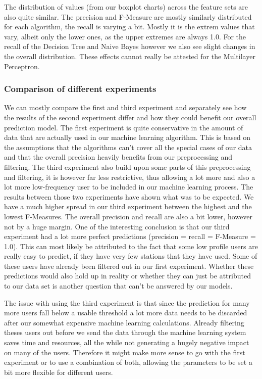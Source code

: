 The distribution of values (from our boxplot charts) across the feature sets are also quite similar. The precision and F-Measure are mostly similarly distributed for each algorithm, the recall is varying a bit. Mostly it is the extrem values that vary, albeit only the lower ones, as the upper extremes are always 1.0. For the recall of the Decision Tree and Naive Bayes however we also see slight changes in the overall distribution. These effects cannot really be attested for the Multilayer Perceptron.

\subsubsection{Comparison of different experiments}
We can mostly compare the first and third experiment and separately see how the results of the second experiment differ and how they could benefit our overall prediction model.
The first experiment is quite conservative in the amount of data that are actually used in our machine learning algorithm. This is based on the assumptions that the algorithms can't cover all the special cases of our data and that the overall precision heavily benefits from our preprocessing and filtering. The third experiment also build upon some parts of this preprocessing and filtering, it is however far less restrictive, thus allowing a lot more and also a lot more low-frequency user to be included in our machine learning process. The results between those two experiments have shown what was to be expected. We have a much higher spread in our third experiment between the highest and the lowest F-Measures. The overall precision and recall are also a bit lower, however not by a huge margin. One of the interesting conclusion is that our third experiment had a lot more perfect predictions (precision = recall = F-Measure = 1.0). This can most likely be attributed to the fact that some low profile users are really easy to predict, if they have very few stations that they have used. Some of these users have already been filtered out in our first experiment. Whether these predictions would also hold up in reality or whether they can just be attributed to our data set is another question that can't be answered by our models. 

The issue with using the third experiment is that since the prediction for many more users fall below a usable threshold a lot more data needs to be discarded after our somewhat expensive machine learning calculations. Already filtering theses users out before we send the data through the machine learning system saves time and resources, all the while not generating a hugely negative impact on many of the users. Therefore it might make more sense to go with the first experiment or to use a combination of both, allowing the parameters to be set a bit more flexible for different users.

